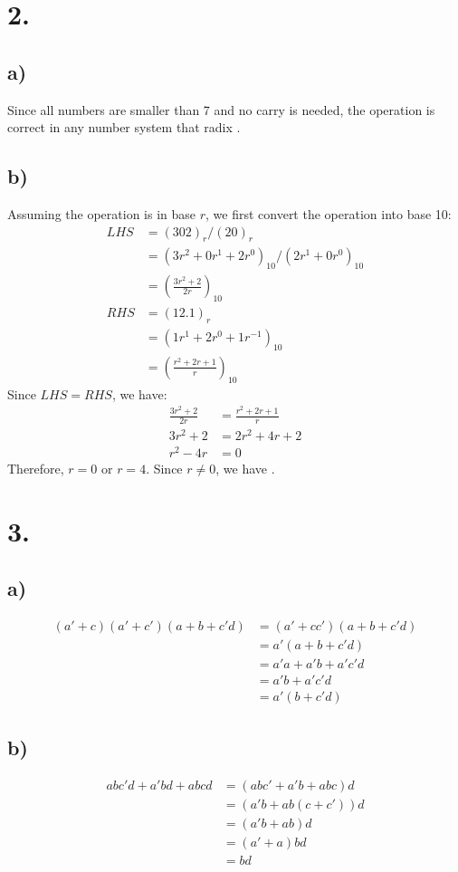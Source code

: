 \documentclass[a4paper,12pt]{article}
\begin{document}
\section*{2.}
\subsection*{a)}
Since all numbers are smaller than 7 and no carry is needed, the operation is correct in any number system that radix .

\subsection*{b)}
Assuming the operation is in base $r$, we first convert the operation into base 10:
\begin{align*}
	LHS &= (302)_r / (20)_r\\
	&= (3r^2 + 0r^1 + 2r^0)_{10} / (2r^1 + 0r^0)_{10}\\
	&= (\frac{3r^2+2}{2r})_{10}\\
	RHS &= (12.1)_r\\
	&= (1r^1 + 2r^0 + 1r^{-1})_{10}\\
	&= (\frac{r^2+2r+1}{r})_{10}
\end{align*}
Since $LHS = RHS$, we have:
\begin{align*}
	\frac{3r^2+2}{2r} &= \frac{r^2+2r+1}{r}\\
	3r^2+2 &= 2r^2+4r+2\\
	r^2-4r &= 0
\end{align*}
Therefore, $r = 0$ or $r = 4$. Since $r \neq 0$, we have .

\section*{3.}
\subsection*{a)}
\begin{align*}
	(a'+c)(a'+c')(a+b+c'd) &= (a'+cc')(a+b+c'd)\\
	&= a'(a+b+c'd)\\
	&= a'a + a'b + a'c'd\\
	&= a'b + a'c'd\\
	&= \boxed{a'(b+c'd)}
\end{align*}

\subsection*{b)}
\begin{align*}
	abc'd+a'bd+abcd &= (abc'+a'b+abc)d\\
	&= (a'b+ab(c+c'))d\\
	&= (a'b+ab)d\\
	&= (a'+a)bd\\
	&= \boxed{bd}
\end{align*}
\end{document}
